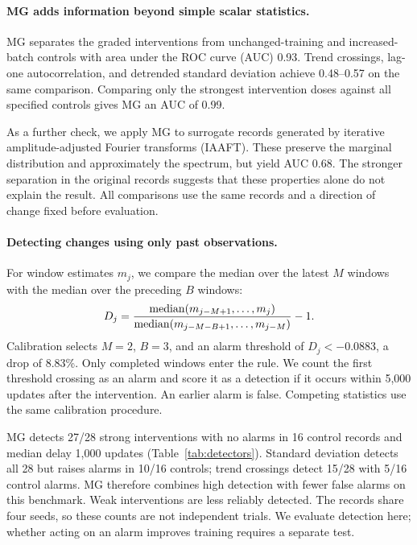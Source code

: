 {\paragraph{MG adds information beyond simple scalar statistics.}
MG separates the graded interventions from unchanged-training and increased-batch controls with area under the ROC curve (AUC) 0.93. Trend crossings, lag-one autocorrelation, and detrended standard deviation achieve 0.48--0.57 on the same comparison. Comparing only the strongest intervention doses against all specified controls gives MG an AUC of 0.99.

As a further check, we apply MG to surrogate records generated by iterative amplitude-adjusted Fourier transforms (IAAFT). These preserve the marginal distribution and approximately the spectrum, but yield AUC 0.68. The stronger separation in the original records suggests that these properties alone do not explain the result. All comparisons use the same records and a direction of change fixed before evaluation.

\paragraph{Detecting changes using only past observations.}
For window estimates $m_j$, we compare the median over the latest $M$ windows with the median over the preceding $B$ windows:
\begin{equation}
D_j=\frac{\operatorname{median}(m_{j-M+1},\ldots,m_j)}
{\operatorname{median}(m_{j-M-B+1},\ldots,m_{j-M})}-1.
\label{eq:detector}
\end{equation}
Calibration selects $M=2$, $B=3$, and an alarm threshold of $D_j<-0.0883$, a drop of 8.83\%. Only completed windows enter the rule. We count the first threshold crossing as an alarm and score it as a detection if it occurs within 5,000 updates after the intervention. An earlier alarm is false. Competing statistics use the same calibration procedure.

MG detects 27/28 strong interventions with no alarms in 16 control records and median delay 1,000 updates (Table~\ref{tab:detectors}). Standard deviation detects all 28 but raises alarms in 10/16 controls; trend crossings detect 15/28 with 5/16 control alarms. MG therefore combines high detection with fewer false alarms on this benchmark. Weak interventions are less reliably detected. The records share four seeds, so these counts are not independent trials. We evaluate detection here; whether acting on an alarm improves training requires a separate test.

}
